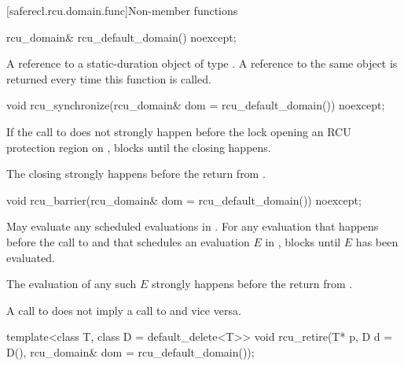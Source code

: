 [saferecl.rcu.domain.func]{Non-member functions}

\begin{itemdecl}
rcu_domain& rcu_default_domain() noexcept;
\end{itemdecl}

\begin{itemdescr}

\pnum
\returns
A reference to a static-duration object of type .
A reference to the same object is returned every time this
function is called.

\end{itemdescr}

\begin{itemdecl}
void rcu_synchronize(rcu_domain& dom = rcu_default_domain()) noexcept;
\end{itemdecl}

\begin{itemdescr}

\pnum
\effects
If the call to  does not strongly
happen before the lock opening an RCU protection region 
on , blocks until the  closing 
happens.

\pnum
\sync
The  closing  strongly
happens before the return from .

\end{itemdescr}

\begin{itemdecl}
void rcu_barrier(rcu_domain& dom = rcu_default_domain()) noexcept;
\end{itemdecl}

\begin{itemdescr}

\pnum
\effects
May evaluate any scheduled evaluations in
. For any evaluation that happens before the call
to  and that schedules an evaluation $E$
in , blocks until $E$ has been evaluated.

\pnum
\sync
The evaluation of any such $E$ strongly
happens before the return from .

\begin{note}
A call to  does not imply a call to 
and vice versa.
\end{note}

\end{itemdescr}

\begin{itemdecl}
template<class T, class D = default_delete<T>>
void rcu_retire(T* p, D d = D(), rcu_domain& dom = rcu_default_domain());
\end{itemdecl}

